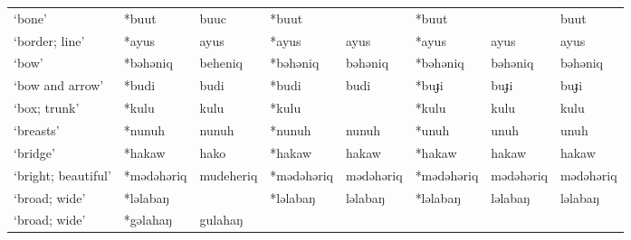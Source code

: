 \begin{landscape}
\begin{longtable}[c]{@{}p{3cm}<{\raggedright}p{2.75cm}<{\raggedright}p{2.75cm}<{\raggedright}p{2.75cm}<{\raggedright}p{2.75cm}<{\raggedright}p{2.75cm}<{\raggedright}p{2.75cm}<{\raggedright}p{2.75cm}<{\raggedright}@{}}
`bone'                                               & *buut              & buuc                           & *buut              &                            & *buut            &                          & buut                              \\
`border; line'                                       & *ayus              & ayus                           & *ayus              & ayus                       & *ayus            & ayus                     & ayus                              \\
`bow'                                                & *bəhəniq           & beheniq                        & *bəhəniq           & bəhəniq                    & *bəhəniq         & bəhəniq                  & bəhəniq                           \\
`bow and arrow'                                      & *budi              & budi                           & *budi              & budi                       & *buɟi            & buɟi                     & buɟi                              \\
`box; trunk'                                         & *kulu              & kulu                           & *kulu              &                            & *kulu            & kulu                     & kulu                              \\
`breasts'                                            & *nunuh             & nunuh                          & *nunuh             & nunuh                      & *unuh            & unuh                     & unuh                              \\
`bridge'                                             & *hakaw             & hako                           & *hakaw             & hakaw                      & *hakaw           & hakaw                    & hakaw                             \\
`bright; beautiful'                                  & *mədəhəriq         & mudeheriq                      & *mədəhəriq         & mədəhəriq                  & *mədəhəriq       & mədəhəriq                & mədəhəriq                         \\
`broad; wide'                                        & *ləlabaŋ           &                                & *ləlabaŋ           & ləlabaŋ                    & *ləlabaŋ         & ləlabaŋ                  & ləlabaŋ                           \\
`broad; wide'                                        & *gəlahaŋ           & gulahaŋ                        &                    &                            &                  &                          &                                   \\

\end{longtable}
\end{landscape}
